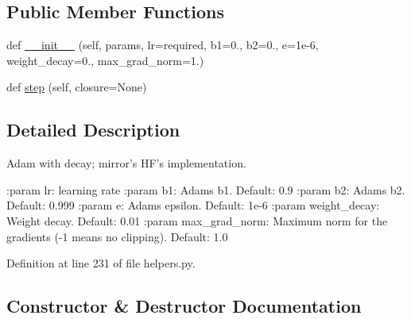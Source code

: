 \subsection*{Public Member Functions}
\begin{DoxyCompactItemize}
\item 
def \hyperlink{classparlai_1_1agents_1_1bert__ranker_1_1helpers_1_1AdamWithDecay_a23ec68b6a5fa73936194b9d1acde8557}{\+\_\+\+\_\+init\+\_\+\+\_\+} (self, params, lr=required, b1=0., b2=0., e=1e-\/6, weight\+\_\+decay=0., max\+\_\+grad\+\_\+norm=1.)
\item 
def \hyperlink{classparlai_1_1agents_1_1bert__ranker_1_1helpers_1_1AdamWithDecay_aeb41188377c1a61b4638228abd6c3e64}{step} (self, closure=None)
\end{DoxyCompactItemize}


\subsection{Detailed Description}
\begin{DoxyVerb}Adam with decay; mirror's HF's implementation.

:param lr:
    learning rate
:param b1:
    Adams b1. Default: 0.9
:param b2:
    Adams b2. Default: 0.999
:param e:
    Adams epsilon. Default: 1e-6
:param weight_decay:
    Weight decay. Default: 0.01
:param max_grad_norm:
    Maximum norm for the gradients (-1 means no clipping).  Default: 1.0
\end{DoxyVerb}
 

Definition at line 231 of file helpers.\+py.



\subsection{Constructor \& Destructor Documentation}
\mbox{\label{classparlai_1_1agents_1_1bert__ranker_1_1helpers_1_1AdamWithDecay_a23ec68b6a5fa73936194b9d1acde8557}} 
